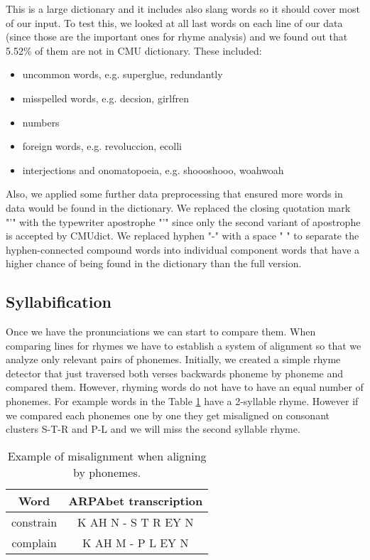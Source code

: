 This is a large dictionary and it includes also slang words so it should cover most of our input. To test this, we looked at all last words on each line of our data (since those are the important ones for rhyme analysis) and we found out that 5.52\% of them are not in CMU dictionary. These included:

\begin{itemize}
	\item uncommon words, e.g. superglue, redundantly
	\item misspelled words, e.g. decsion, girlfren
	\item numbers
	\item foreign words, e.g. revoluccion, ecolli
	\item interjections and onomatopoeia, e.g. shoooshooo, woahwoah
\end{itemize}

Also, we applied some further data preprocessing that ensured more words in data would be found in the dictionary. We replaced the closing quotation mark "’" with the typewriter apostrophe "'" since only the second variant of apostrophe is accepted by CMUdict. We replaced hyphen "-" with a space " " to separate the hyphen-connected compound words into individual component words that have a higher chance of being found in the dictionary than the full version.

\subsection{Syllabification}
Once we have the pronunciations we can start to compare them. When comparing lines for rhymes we have to establish a system of alignment so that we analyze only relevant pairs of phonemes. Initially, we created a simple rhyme detector that just traversed both verses backwards phoneme by phoneme and compared them. However, rhyming words do not have to have an equal number of phonemes. For example words in the Table \ref{phon_misalign_table} have a 2-syllable rhyme. However if we compared each phonemes one by one they get misaligned on consonant clusters S-T-R and P-L and we will miss the second syllable rhyme.

\begin{table}[h!]
	\centering
	\begin{tabular}{c c} 
		Word & ARPAbet transcription \\ [0.5ex] 
		\hline
		constrain & K AH N - S T R EY N \\ 
		complain & K AH M - P L EY N \\
	\end{tabular}
	\caption{Example of misalignment when aligning by phonemes.}
	\label{phon_misalign_table}
\end{table}

